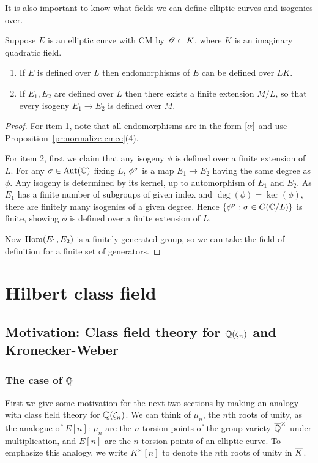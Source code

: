 It is also important to know what fields we can define elliptic curves and isogenies over.
\begin{pr}
Suppose $E$ is an elliptic curve with CM by $\mathscr{O}\subset K$, where $K$ is an imaginary quadratic field.
\begin{enumerate}
\item
If $E$ is defined over $L$ then endomorphisms of $E$ can be defined over $LK$.
\item
If $E_1,E_2$ are defined over $L$ then there exists a finite extension $M/L$, so that every isogeny $E_1\to E_2$ is defined over $M$.
\end{enumerate}
\end{pr}
\begin{proof}
For item 1, note that all endomorphisms are in the form $[\alpha]$ and use Proposition~\ref{pr:normalize-cmec}(4). 

For item 2, first we claim that any isogeny $\phi$ is defined over a finite extension of $L$. For any $\sigma\in \operatorname{Aut}(\mathbb{C})$ fixing $L$, $\phi^{\sigma}$ is a map $E_1\to E_2$ having the same degree as $\phi$.
Any isogeny is determined by its kernel, up to automorphism of $E_1$ and $E_2$. As $E_1$ has a finite number of subgroups of given index and $\deg(\phi)=\ker(\phi)$, there are finitely many isogenies of a given degree. Hence $\left\{{\phi^{\sigma}}:{\sigma \in G(\mathbb{C}/L)}\right\}$ is finite, showing $\phi$ is defined over a finite extension of $L$.

Now $\operatorname{Hom}(E_1,E_2)$ is a finitely generated group, so we can take the field of definition for a finite set of generators.
\end{proof}
\section{Hilbert class field}
\subsection{Motivation: Class field theory for $\mathbb{Q}(\zeta_n)$ and Kronecker-Weber}
\subsubsection{The case of $\mathbb{Q}$}
First we give some motivation for the next two sections by making an analogy with class field theory for $\mathbb{Q}(\zeta_n)$.
We can think of $\mu_n$, the $n$th roots of unity, as the analogue of $E[n]$: $\mu_n$ are the $n$-torsion points of the group variety $\overline{\mathbb{Q}}^{\times}$ under multiplication, and $E[n]$ are the $n$-torsion points of an elliptic curve. To emphasize this analogy, we write $K^{\times}[n]$ to denote the $n$th roots of unity in $\overline{K}$.

